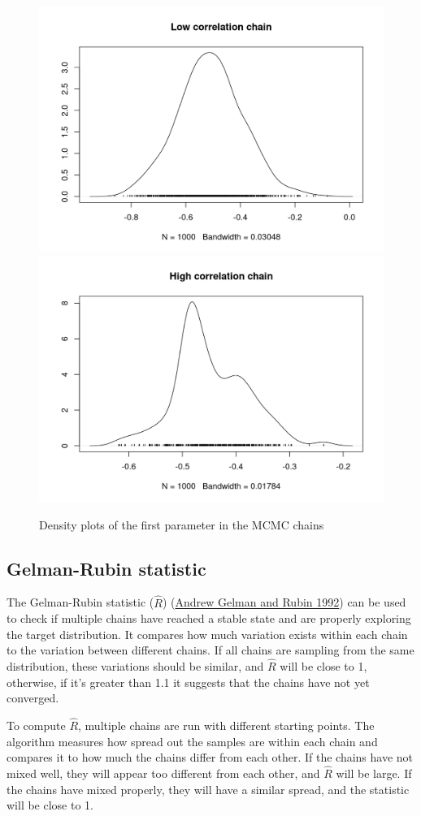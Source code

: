 \documentclass[
]{book}
\begin{document}
\begin{figure}
\includegraphics[width=0.5\linewidth]{_bookdown_files/_main_files/figure-html/dens01-1} \includegraphics[width=0.5\linewidth]{_bookdown_files/_main_files/figure-html/dens01-2} \caption{Density plots of the first parameter in the MCMC chains}\label{fig:dens01}
\end{figure}

\hypertarget{gelman-rubin-statistic}{%
\subsection{Gelman-Rubin statistic}\label{gelman-rubin-statistic}}

The Gelman-Rubin statistic (\(\hat{R}\)) (\protect\hyperlink{ref-gelman1992inference}{Andrew Gelman and Rubin 1992}) can be used to check if multiple chains have reached a stable state and are properly exploring the target distribution. It compares how much variation exists within each chain to the variation between different chains. If all chains are sampling from the same distribution, these variations should be similar, and \(\hat{R}\) will be close to 1, otherwise, if it's greater than 1.1 it suggests that the chains have not yet converged.

To compute \(\hat{R}\), multiple chains are run with different starting points. The algorithm measures how spread out the samples are within each chain and compares it to how much the chains differ from each other. If the chains have not mixed well, they will appear too different from each other, and \(\hat{R}\) will be large. If the chains have mixed properly, they will have a similar spread, and the statistic will be close to 1.
\end{document}
